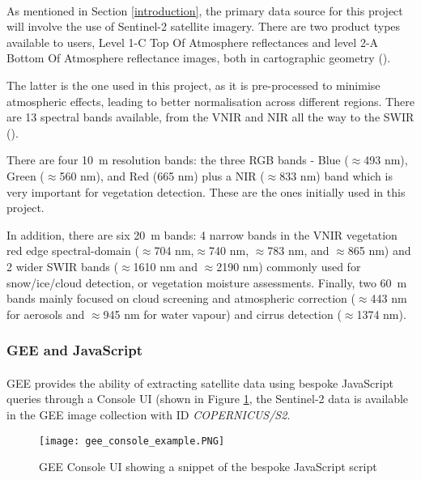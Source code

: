 \paragraph{}
As mentioned in Section \ref{introduction}, the primary data source for this project will involve the use of Sentinel-2 satellite imagery. There are two product types available to users, Level 1-C Top Of Atmosphere reflectances and level 2-A Bottom Of Atmosphere reflectance images, both in cartographic geometry (\cite{sentinel2}). 

The latter is the one used in this project, as it is pre-processed to minimise atmospheric effects, leading to better normalisation across different regions.
There are 13 spectral bands available, from the \gls{VNIR} and \gls{NIR} all the way to the \gls{SWIR} (\cite{sentinel2}).

There are four \SI{10}{\metre} resolution bands: the three \gls{RGB} bands - Blue ($\approx$493 nm), Green ($\approx$560 nm), and Red (665 nm) plus a \gls{NIR} ($\approx$833 nm) band which is very important for vegetation detection. These are the ones initially used in this project.

In addition, there are six \SI{20}{\metre} bands: 4 narrow bands in the \gls{VNIR} vegetation red edge spectral-domain ($\approx$704 nm,$\approx$740 nm, $\approx$783 nm, and $\approx$865 nm) and 2 wider \gls{SWIR} bands ($\approx$1610 nm and $\approx$2190 nm) commonly used for snow/ice/cloud detection, or vegetation moisture assessments. Finally, two \SI{60}{\metre} bands mainly focused on cloud screening and atmospheric correction ($\approx$443 nm for aerosols and $\approx$945 nm for water vapour) and cirrus detection ($\approx$1374 nm).
\subsubsection{\gls{GEE} and JavaScript}
\paragraph{}
\gls{GEE} provides the ability of extracting satellite data using bespoke JavaScript queries through a Console \gls{UI} (shown in Figure \ref{gee_console_ui}, the Sentinel-2 data is available in the \gls{GEE} image collection with ID \textit{COPERNICUS/S2}.

    \begin{figure}[hbt!]
        \centering
        \texttt{[image: gee\_console\_example.PNG]}
        \caption{\gls{GEE} Console \gls{UI} showing a snippet of the bespoke JavaScript script}
        \label{gee_console_ui}
    \end{figure}

